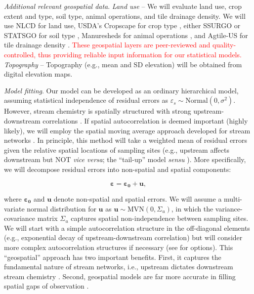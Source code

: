 \documentclass[12pt, class=article, crop=false]{standalone}
\begin{document}
\textit{Additional relevant geospatial data}.
\textit{Land use} -- We will evaluate land use, crop extent and type, soil type, animal operations, and tile drainage density. We will use NLCD for land use, USDA's Cropscape for crop type \citep{han_cropscape_2012}, either SSURGO or STATSGO for soil type \citep{us_department_of_agriculture_soil_2024, us_department_of_agriculture_us_2024}, Manuresheds for animal operations \citep{spiegal_manuresheds_2020}, and Agtile-US for tile drainage density \citep{valayamkunnath_mapping_2020}.
\textcolor{red}{These geospatial layers are peer-reviewed and quality-controlled, thus providing reliable input information for our statistical models.}
\textit{Topography} -- Topography (e.g., mean and SD elevation) will be obtained from digital elevation maps.

\textit{Model fitting}.
Our model can be developed as an ordinary hierarchical model, assuming statistical independence of residual errors as $\varepsilon_s \sim \mbox{Normal}(0, \sigma^2)$.
However, stream chemistry is spatially structured with strong upstream-downstream correlations \citep{peterson_patterns_2006, peterson_modelling_2013}.
If spatial autocorrelation is deemed important (highly likely), we will employ the spatial moving average approach developed for stream networks \citep{ver_hoef_spatial_2006}.
In principle, this method will take a weighted mean of residual errors given the relative spatial locations of sampling sites (e.g., upstream affects downstream but NOT \textit{vice versa}; the ``tail-up'' model \textit{sensu} \citep{peterson_modelling_2013}).
More specifically, we will decompose residual errors into non-spatial and spatial components:

\begin{equation}
\pmb{\varepsilon} = \pmb{\varepsilon_0} + \pmb{u},
\end{equation}

where $\pmb{\varepsilon_0}$ and $\pmb{u}$ denote non-spatial and spatial errors. We will assume a multi-variate normal distribution for $\pmb{u}$ as $\pmb{u} \sim \mbox{MVN}(0, \Sigma_{u})$, in which the variance-covariance matrix $\Sigma_{u}$ captures spatial non-independence between sampling sites.
We will start with a simple autocorrelation structure in the off-diagonal elements (e.g., exponential decay of upstream-downstream correlation) but will consider more complex autocorrelation structures if necessary (see \citep{ver_hoef_spatial_2006} for options).
This ``geospatial'' approach has two important benefits. First, it captures the fundamental nature of stream networks, i.e., upstream dictates downstream stream chemistry \citep{peterson_modelling_2013}.
Second, geospatial models are far more accurate in filling spatial gaps of observation \citep{ver_hoef_spatial_2006, peterson_mixed-model_2010, peterson_modelling_2013}.
\end{document}
